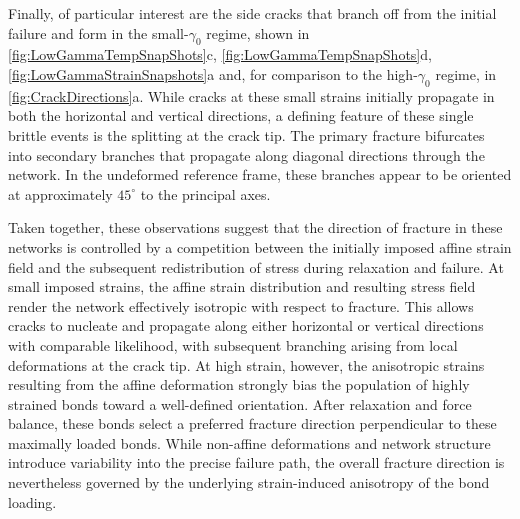 Finally, of particular interest are the side cracks that branch off from the initial failure and form in the small-$\gamma_0$ regime, shown in \cref{fig:LowGammaTempSnapShots}c, \cref{fig:LowGammaTempSnapShots}d, \cref{fig:LowGammaStrainSnapshots}a and, for comparison to the high-$\gamma_0$ regime, in \cref{fig:CrackDirections}a. While cracks at these small strains initially propagate in both the horizontal and vertical directions, a defining feature of these single brittle events is the splitting at the crack tip. The primary fracture bifurcates into secondary branches that propagate along diagonal directions through the network. In the undeformed reference frame, these branches appear to be oriented at approximately $45^\circ$ to the principal axes.


Taken together, these observations suggest that the direction of fracture in these networks is controlled by a competition between the initially imposed affine strain field and the subsequent redistribution of stress during relaxation and failure. At small imposed strains, the affine strain distribution and resulting stress field render the network effectively isotropic with respect to fracture. This allows cracks to nucleate and propagate along either horizontal or vertical directions with comparable likelihood, with subsequent branching arising from local deformations at the crack tip. At high strain, however, the anisotropic strains resulting from the affine deformation strongly bias the population of highly strained bonds toward a well-defined orientation. After relaxation and force balance, these bonds select a preferred fracture direction perpendicular to these maximally loaded bonds. While non-affine deformations and network structure introduce variability into the precise failure path, the overall fracture direction is nevertheless governed by the underlying strain-induced anisotropy of the bond loading.


